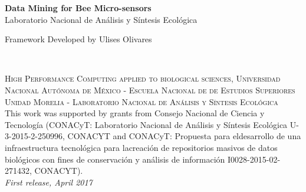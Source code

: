 \documentclass[11pt,fleqn]{book} %
\begin{document}

\begingroup
\thispagestyle{empty}
\centering
\vspace*{4cm}
\par\normalfont\fontsize{35}{35}\sffamily\selectfont
\textbf{\color{white}Data Mining for Bee Micro-sensors}\\
{\Huge\color{white} Laboratorio Nacional de Análisis y Síntesis Ecológica}\par %
\vspace*{0.2cm}
{\LARGE\color{white} Framework Developed by Ulises Olivares}\par %
\endgroup


\newpage
~\vfill
\thispagestyle{empty}


\noindent \textsc{High Performance Computing applied to biological sciences, Universidad Nacional Autónoma de México - Escuela Nacional de de Estudios Superiores Unidad Morelia - Laboratorio Nacional de Análisis y Síntesis Ecológica }\\

\noindent  This work was supported by grants from Consejo Nacional de Ciencia y Tecnología (CONACyT: Laboratorio Nacional de Análisis y Síntesis Ecológica U-3-2015-2-250996, CONACYT and CONACyT: Propuesta para eldesarrollo de una infraestructura tecnológica para lacreación de repositorios masivos de datos biológicos con fines de conservación y análisis de información I0028-2015-02-271432, CONACYT).\\ %

\noindent \textit{First release, April 2017} %

\end{document}
